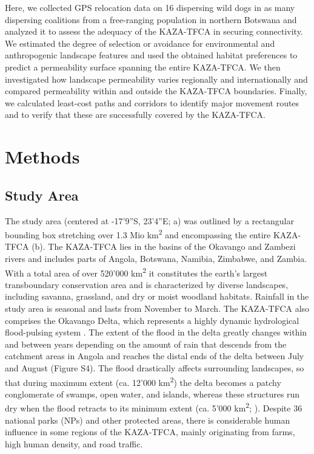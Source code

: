 \documentclass[abstract=on,10pt,a4paper,bibliography=totocnumbered]{article}
\begin{document}
Here, we collected GPS relocation data on 16 dispersing wild dogs in as many
dispersing coalitions from a free-ranging population in northern Botswana and
analyzed it to assess the adequacy of the KAZA-TFCA in securing connectivity. We
estimated the degree of selection or avoidance for environmental and
anthropogenic landscape features and used the obtained habitat preferences to
predict a permeability surface spanning the entire KAZA-TFCA. We then
investigated how landscape permeability varies regionally and internationally
and compared permeability within and outside the KAZA-TFCA boundaries. Finally,
we calculated least-cost paths and corridors to identify major movement routes
and to verify that these are successfully covered by the KAZA-TFCA.

\section{Methods}
\subsection{Study Area}
The study area (centered at -17'9''S, 23'4''E;
a) was outlined by a rectangular bounding box stretching over
1.3 Mio km\textsuperscript{2} and encompassing the entire KAZA-TFCA
(b). The KAZA-TFCA lies in the basins of the Okavango and
Zambezi rivers and includes parts of Angola, Botswana, Namibia, Zimbabwe, and
Zambia. With a total area of over 520'000 km\textsuperscript{2} it constitutes
the earth's largest transboundary conservation area and is characterized by
diverse landscapes, including savanna, grassland, and dry or moist woodland
habitats. Rainfall in the study area is seasonal and lasts from November to
March. The KAZA-TFCA also comprises the Okavango Delta, which represents a
highly dynamic hydrological flood-pulsing system \citep{McNutt.1996,
Wolski.2017}. The extent of the flood in the delta greatly changes within and
between years depending on the amount of rain that descends from the catchment
areas in Angola and reaches the distal ends of the delta between July and August
(Figure S4). The flood drastically affects surrounding landscapes, so that
during maximum extent (ca. 12'000 km\textsuperscript{2}) the delta becomes a
patchy conglomerate of swamps, open water, and islands, whereas these structures
run dry when the flood retracts to its minimum extent (ca. 5'000
km\textsuperscript{2}; \citealp{Wolski.2017}). Despite 36 national parks (NPs)
and other protected areas, there is considerable human influence in some regions
of the KAZA-TFCA, mainly originating from farms, high human density, and road
traffic.
\end{document}
